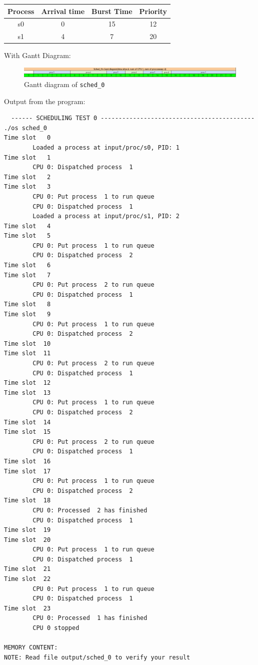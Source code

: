 \documentclass[a4paper]{article}
\numberwithin{equation}{section}
\begin{document}
\begin{table}[H]
  \centering
  \begin{tabular}{cccc}
    \toprule
    Process & Arrival time & Burst Time & Priority \\
    \midrule
    s0      & 0            & 15         & 12       \\
    s1      & 4            & 7          & 20       \\
    \bottomrule
  \end{tabular}
\end{table}

With Gantt Diagram:

\begin{figure}[H]
  \centering
  \includegraphics[width=1\textwidth]{sche0_gantt.png}
  \caption{Gantt diagram of \texttt{sched_0}}
\end{figure}

Output from the program:

\begin{mdframed}[leftline=false,rightline=false,backgroundcolor=grey!10,nobreak=false]
  \begin{verbatim}
  ------ SCHEDULING TEST 0 -------------------------------------------
./os sched_0
Time slot   0
        Loaded a process at input/proc/s0, PID: 1
Time slot   1
        CPU 0: Dispatched process  1
Time slot   2
Time slot   3
        CPU 0: Put process  1 to run queue
        CPU 0: Dispatched process  1
        Loaded a process at input/proc/s1, PID: 2
Time slot   4
Time slot   5
        CPU 0: Put process  1 to run queue
        CPU 0: Dispatched process  2
Time slot   6
Time slot   7
        CPU 0: Put process  2 to run queue
        CPU 0: Dispatched process  1
Time slot   8
Time slot   9
        CPU 0: Put process  1 to run queue
        CPU 0: Dispatched process  2
Time slot  10
Time slot  11
        CPU 0: Put process  2 to run queue
        CPU 0: Dispatched process  1
Time slot  12
Time slot  13
        CPU 0: Put process  1 to run queue
        CPU 0: Dispatched process  2
Time slot  14
Time slot  15
        CPU 0: Put process  2 to run queue
        CPU 0: Dispatched process  1
Time slot  16
Time slot  17
        CPU 0: Put process  1 to run queue
        CPU 0: Dispatched process  2
Time slot  18
        CPU 0: Processed  2 has finished
        CPU 0: Dispatched process  1
Time slot  19
Time slot  20
        CPU 0: Put process  1 to run queue
        CPU 0: Dispatched process  1
Time slot  21
Time slot  22
        CPU 0: Put process  1 to run queue
        CPU 0: Dispatched process  1
Time slot  23
        CPU 0: Processed  1 has finished
        CPU 0 stopped

MEMORY CONTENT: 
NOTE: Read file output/sched_0 to verify your result
  \end{verbatim}
\end{mdframed}
\end{document}
